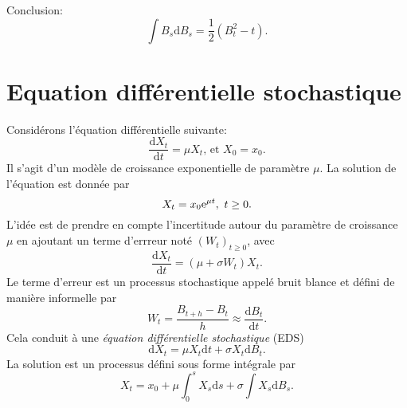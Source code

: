 \begin{ex}
\begin{enumerate}
\end{enumerate}
Conclusion:
$$
\int B_s\text{d}B_s = \frac{1}{2}(B_t^2 - t).
$$

\end{ex}
\section{Equation différentielle stochastique}\label{sec:eds}
Considérons l'équation différentielle suivante:
$$
\frac{\text{d}X_t}{\text{d}t} = \mu X_t\text{, et }X_0 = x_0.
$$
Il s'agit d'un modèle de croissance exponentielle de paramètre $\mu$. La solution de l'équation est donnée par 
$$
X_t = x_0\mathrm{e}^{\mu t},\text{ }t\geq 0.
$$
L'idée est de prendre en compte l'incertitude autour du paramètre de croissance $\mu$ en ajoutant un terme d'errreur noté $(W_t)_{t\geq 0}$, avec 
$$
\frac{\text{d}X_t}{\text{d}t} = (\mu+\sigma W_t) X_t.
$$
Le terme d'erreur est un processus stochastique appelé bruit blance et défini de manière informelle par 
$$
W_t = \frac{B_{t+h}-B_t}{h}\approx\frac{\text{d}B_t}{\text{d}t}.
$$
Cela conduit à une \textit{équation différentielle stochastique} (EDS)
$$
\text{d}X_t = \mu X_t\text{d}t+\sigma X_t\text{d}B_t.
$$
La solution est un processus défini sous forme intégrale par 
$$
X_t = x_0 + \mu \int_0^s X_s\text{d}s+\sigma \int X_s\text{d}B_s.
$$

